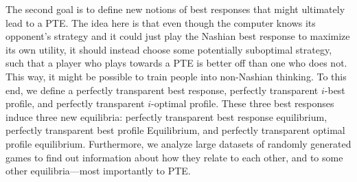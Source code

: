 The second goal is to define new notions of best responses that might ultimately lead to a PTE.
The idea here is that even though the computer knows its opponent's strategy and it could just play the Nashian best response to maximize its own utility, it should instead choose some potentially suboptimal strategy, such that a player who plays towards a PTE is better off than one who does not.
This way, it might be possible to train people into non-Nashian thinking.
To this end, we define a perfectly transparent best response, perfectly transparent $i$-best profile, and perfectly transparent $i$-optimal profile.
These three best responses induce three new equilibria: perfectly transparent best response equilibrium, perfectly transparent best profile Equilibrium, and perfectly transparent optimal profile equilibrium.
Furthermore, we analyze large datasets of randomly generated games to find out information about how they relate to each other, and to some other equilibria---most importantly to PTE.
